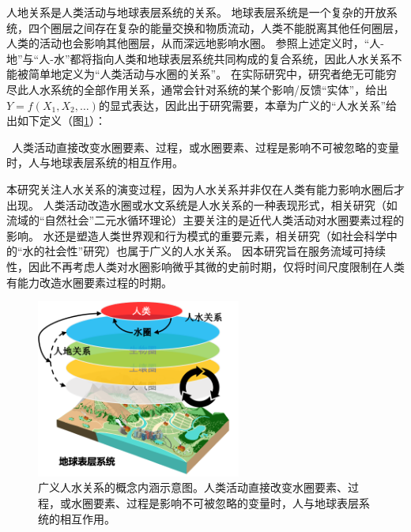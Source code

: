 人地关系是人类活动与地球表层系统的关系\cite{wu1991,li2016d}。
地球表层系统是一个复杂的开放系统，四个圈层之间存在复杂的能量交换和物质流动，人类不能脱离其他任何圈层，人类的活动也会影响其他圈层，从而深远地影响水圈。
参照上述定义时，“人-地”与“人-水”都将指向人类和地球表层系统共同构成的复合系统，因此人\textendash{}水关系不能被简单地定义为“人类活动与水圈的关系”。
在实际研究中，研究者绝无可能穷尽此人水系统的全部作用关系，通常会针对系统的某个影响/反馈“实体”，给出$Y = f(X_1, X_2, \dots)$的显式表达，因此出于研究需要，本章为广义的“人\textendash{}水关系”给出如下定义（图\ref{ch2:fig:definitions}）：

{\kai~人类活动直接改变水圈要素、过程，或水圈要素、过程是影响不可被忽略的变量时，人与地球表层系统的相互作用。}

本研究关注人\textendash{}水关系的演变过程，因为人\textendash{}水关系并非仅在人类有能力影响水圈后才出现。
人类活动改造水圈或水文系统是人\textendash{}水关系的一种表现形式，相关研究（如流域的“自然\textendash{}社会”二元水循环理论）主要关注的是近代人类活动对水圈要素过程的影响\cite{wang2006, wang2016}。
水还是塑造人类世界观和行为模式的重要元素，相关研究（如社会科学中的“水的社会性”研究）也属于广义的人\textendash{}水关系。
因本研究旨在服务流域可持续性，因此不再考虑人类对水圈影响微乎其微的史前时期，仅将时间尺度限制在人类有能力改造水圈要素过程的时期。

\begin{figure}[!ht]
    \centering
    \includegraphics[width=0.6\textwidth]{img/ch2/ch2_scope.png}
    \caption[广义人\textendash{}水关系的概念内涵示意图]{广义人\textendash{}水关系的概念内涵示意图。人类活动直接改变水圈要素、过程，或水圈要素、过程是影响不可被忽略的变量时，人与地球表层系统的相互作用。}\label{ch2:fig:definitions}
\end{figure}


